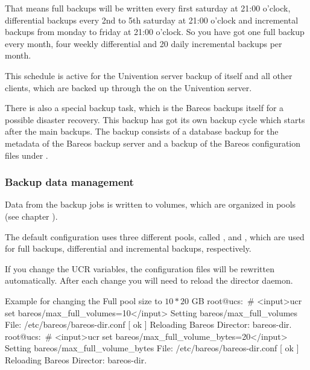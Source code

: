 That means full backups will be written every first saturday at 21:00 o'clock, differential backups every 2nd to 5th saturday at 21:00 o'clock and incremental backups from monday to friday at 21:00 o'clock. So you have got one full backup every month, four weekly differential and 20 daily incremental backups per month.

This schedule is active for the Univention server backup of itself and all other clients, which are backed up through the  on the Univention server.

There is also a special backup task, which is the Bareos backups itself for a possible disaster recovery. This backup has got its own backup cycle which starts after the main backups. The backup consists of a database backup for the metadata of the Bareos backup server and a backup of the Bareos configuration files under .



\subsubsection{Backup data management}

Data from the backup jobs is written to volumes, which are organized in pools (see chapter ).

The default configuration uses three different pools, called ,  and ,
which are used for full backups, differential and incremental backups, respectively.

% 

If you change the UCR variables, the configuration files will be rewritten automatically. After each change you will need to reload the director daemon.

\begin{commands}{Example for changing the Full pool size to $10 \ast 20$ GB}
root@ucs:~# <input>ucr set bareos/max_full_volumes=10</input>
Setting bareos/max_full_volumes
File: /etc/bareos/bareos-dir.conf
[ ok ] Reloading Bareos Director: bareos-dir.
root@ucs:~# <input>ucr set bareos/max_full_volume_bytes=20</input>
Setting bareos/max_full_volume_bytes
File: /etc/bareos/bareos-dir.conf
[ ok ] Reloading Bareos Director: bareos-dir.
\end{commands}

